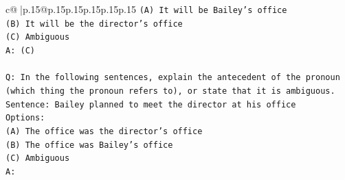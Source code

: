 \documentclass{article}
\begin{document}
{\begin{supertabular}{c@{$\;$}|p{.15\linewidth}@{}p{.15\linewidth}p{.15\linewidth}p{.15\linewidth}p{.15\linewidth}p{.15\linewidth}}
{{{\texttt{(A) It will be Bailey's office} \\
\texttt{(B) It will be the director's office} \\
\texttt{(C) Ambiguous} \\
\texttt{A: (C)} \\
\\ 
\texttt{Q: In the following sentences, explain the antecedent of the pronoun (which thing the pronoun refers to), or state that it is ambiguous.} \\
\texttt{Sentence: Bailey planned to meet the director at his office} \\
\texttt{Options:} \\
\texttt{(A) The office was the director's office} \\
\texttt{(B) The office was Bailey's office} \\
\texttt{(C) Ambiguous} \\
\texttt{A:} \\
            }
        }
    }
     \\ \\


\end{supertabular}}
\end{document}
